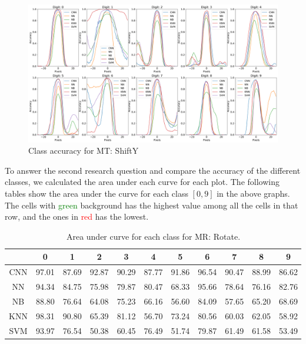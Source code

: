     \begin{figure}[H]
    \centering
        \includegraphics[width=\textwidth]{chapters/results/MT/ShiftYAll.png}
        \caption{Class accuracy for MT: ShiftY}
        \label{fig:Digit by misclassification for ShiftY MR}
    \end{figure}
    
  To answer the second research question and compare the accuracy of the different classes, we calculated the area under each curve for each plot. The following tables show the area under the curve for each class $[0,9]$ in the above graphs. The cells with \textcolor{green}{green} background has the highest value among all the cells in that row, and the ones in \textcolor{red}{red} has the lowest.
    \begin{table}[H]
    \centering
        \begin{tabular}{|c|c|c|c|c|c|c|c|c|c|c|}
        \hline
         & 0 & 1 & 2 & 3 & 4 & 5 & 6 & 7 & 8 & 9 \\
        \hline
        CNN & \cellcolor{green!25} 97.01 & 87.69 & 92.87 & 90.29 & 87.77 & 91.86 & 96.54 & 90.47 & 88.99 & \cellcolor{red!25}86.62 \\ 
        \hline
        NN &   94.34 & 84.75 & 75.98 & 79.87 & 80.47 & \cellcolor{red!25}68.33 & \cellcolor{green!25}95.66 & 78.64 & 76.16 & 82.76 \\
        \hline
        NB & \cellcolor{green!25}88.80 & 76.64 & 64.08 & 75.23 & 66.16 & \cellcolor{red!25}56.60 & 84.09 & 57.65 & 65.20 & 68.69 \\
        \hline
        KNN & \cellcolor{green!25}98.31 & 90.80 & 65.39 & 81.12 & \cellcolor{red!25}56.70 & 73.24 & 80.56 & 60.03 & 62.05 & 58.92 \\
        \hline
        SVM & \cellcolor{green!25}93.97 & 76.54 & \cellcolor{red!25}50.38 & 60.45 & 76.49 & 51.74 & 79.87 & 61.49 & 61.58 & 53.49 \\
        \hline
        \end{tabular}
        \caption{Area under curve for each class for MR: Rotate.}
        \label{tbl:test-file-formatRotate}
    \end{table}
    
